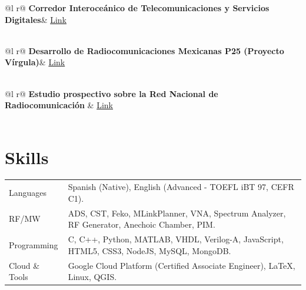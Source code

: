 \documentclass[letterpaper,10pt]{article}
\begin{document}
\begin{tabularx}{\linewidth}{ @{}l r@{} }
\textbf{Corredor Interoceánico de Telecomunicaciones y Servicios Digitales}& \hfill \href{https://www.ipn.mx/imageninstitucional/comunicados/ver-comunicado.html?y=2023\&n=1}{Link}\\[3.75pt]
  \\
\end{tabularx}

\begin{tabularx}{\linewidth}{ @{}l r@{} }
\textbf{Desarrollo de Radiocomunicaciones Mexicanas P25 (Proyecto Vírgula)}& \hfill \href{https://www.youtube.com/watch?v=fkjy8IcuUEE}{Link}\\[3.75pt]
  \\
\end{tabularx}

\begin{tabularx}{\linewidth}{ @{}l r@{} }
\textbf{Estudio prospectivo sobre la Red Nacional de Radiocomunicación} & \hfill \href{https://www.gob.mx/sesnsp/articulos/estudio-prospectivo-sobre-la-red-nacional-de-radiocomunicacion-183638?idiom=es}{Link} \\[3.75pt]
  \\
\end{tabularx}
\section{Skills}
\begin{tabularx}{\linewidth}{@{}l X@{}}
Languages &  Spanish (Native), English (Advanced - TOEFL iBT 97, CEFR C1).\\
RF/MW & ADS, CST, Feko, MLinkPlanner, VNA, Spectrum Analyzer, RF Generator, Anechoic Chamber, PIM. \\
Programming  & C, C++, Python, MATLAB, VHDL, Verilog-A, JavaScript, HTML5, CSS3, NodeJS, MySQL, MongoDB.\\  
Cloud \& Tools & Google Cloud Platform (Certified Associate Engineer), LaTeX, Linux, QGIS.
\end{tabularx}
\end{document}

